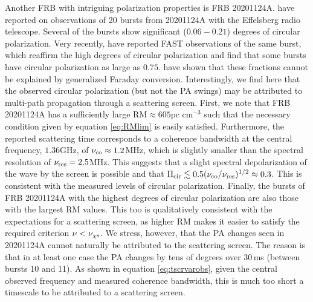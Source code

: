 \documentclass[fleqn,usenatbib]{mnras}
\begin{document}
	Another FRB with intriguing polarization properties is FRB 20201124A. \cite{Hilmarsson2021} have reported on observations of 20 bursts from 20201124A with the Effelsberg radio telescope. Several of the bursts show significant ($0.06-0.21$) degrees of circular polarization. Very recently, \citep{Xu2021} have reported FAST observations of the same burst, which reaffirm the high degrees of circular polarization and find that some bursts have circular polarization as large as $0.75$. \cite{Hilmarsson2021} have shown that these fractions cannot be explained by generalized Faraday conversion. Interestingly, we find here that the observed circular polarization (but not the PA swings) may be attributed to multi-path propagation through a scattering screen. First, we note that FRB 20201124A has a sufficiently large RM$\approx 605\mbox{pc cm}^{-3}$ such that the necessary condition given by equation \ref{eq:RMlim} is easily satisfied. Furthermore, the reported scattering time corresponds to a coherence bandwidth at the central frequency, $1.36$GHz, of $\nu_{\rm co}\approx 1.2$MHz, which is slightly smaller than the spectral resolution of $\nu_{\rm res}=2.5$MHz. This suggests that a slight spectral depolarization of the wave by the screen is possible and that $\Pi_{\rm cir}\lesssim 0.5(\nu_{\rm co}/\nu_{\rm res})^{1/2}\approx 0.3$. This is consistent with the measured levels of circular polarization. Finally, the bursts of FRB 20201124A with the highest degrees of circular polarization are also those with the largest RM values. This too is qualitatively consistent with the expectations for a scattering screen, as higher RM makes it easier to satisfy the required criterion $\nu<\nu_{\rm \chi s}$. We stress, however, that the PA changes seen in 20201124A cannot naturally be attributed to the scattering screen. The reason is that in at least one case the PA changes by tens of degrees over 30\,ms (between bursts 10 and 11). As shown in equation \ref{eq:tscrvarobs}, given the central observed frequency and measured coherence bandwidth, this is much too short a timescale to be attributed to a scattering screen.
	
\end{document}
